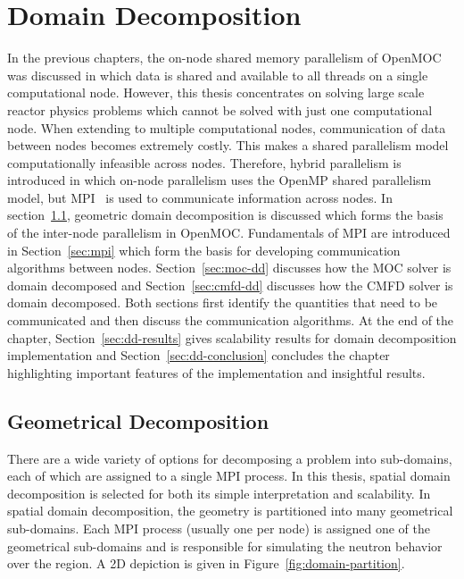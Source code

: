 \chapter{Domain Decomposition}
\label{chap:domain-decomposition}

In the previous chapters, the on-node shared memory parallelism of OpenMOC was discussed in which data is shared and available to all threads on a single computational node. However, this thesis concentrates on solving large scale reactor physics problems which cannot be solved with just one computational node. When extending to multiple computational nodes, communication of data between nodes becomes extremely costly. This makes a shared parallelism model computationally infeasible across nodes. Therefore, hybrid parallelism is introduced in which on-node parallelism uses the OpenMP shared parallelism model, but \ac{MPI}~\cite{mpi} is used to communicate information across nodes. In section~\ref{sec:geometrical-decomposition}, geometric domain decomposition is discussed which forms the basis of the inter-node parallelism in OpenMOC. Fundamentals of \ac{MPI} are introduced in Section~\ref{sec:mpi} which form the basis for developing communication algorithms between nodes. Section~\ref{sec:moc-dd} discusses how the \ac{MOC} solver is domain decomposed and Section~\ref{sec:cmfd-dd} discusses how the \ac{CMFD} solver is domain decomposed. Both sections first identify the quantities that need to be communicated and then discuss the communication algorithms. At the end of the chapter, Section~\ref{sec:dd-results} gives scalability results for domain decomposition implementation and Section~\ref{sec:dd-conclusion} concludes the chapter highlighting important features of the implementation and insightful results.

\section{Geometrical Decomposition}
\label{sec:geometrical-decomposition}

There are a wide variety of options for decomposing a problem into sub-domains, each of which are assigned to a single \ac{MPI} process. In this thesis, spatial domain decomposition is selected for both its simple interpretation and scalability. In spatial domain decomposition, the geometry is partitioned into many geometrical sub-domains. Each \ac{MPI} process (usually one per node) is assigned one of the geometrical sub-domains and is responsible for simulating the neutron behavior over the region. A 2D depiction is given in Figure~\ref{fig:domain-partition}.

